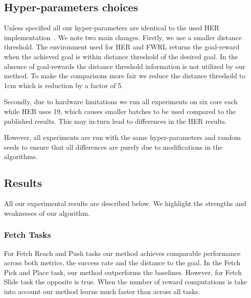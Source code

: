\subsection{Hyper-parameters choices}
Unless specified all our hyper-parameters are identical to the used HER
implementation~\citep{dhariwal2017baselines}. We note two main changes. Firstly,
we use a smaller distance threshold.
The environment used for HER and FWRL returns the goal-reward when the
achieved goal is within distance threshold of the desired goal. In the absence
of goal-rewards the distance threshold information is not utilized by our
method.
To make the comparisons more fair we reduce the distance threshold to 1cm which
is reduction by a factor of 5.

Secondly, due to hardware limitations we run all experiments on six core each
while HER uses 19, which causes smaller batches to be used compared to the
published results. This may in-turn lead to differences in the HER results.

However, all experiments are run with the same hyper-parameters and random seeds
to ensure that all differences are purely due to modifications in the algorithms.

\subsection{Results}
All our experimental results are described below. We highlight the strengths and
weaknesses of our algorithm.

\subsubsection{Fetch Tasks}

For Fetch Reach and Push tasks our method achieves comparable performance
across both metrics, the success rate and the distance to the goal. In the Fetch
Pick and Place task, our method outperforms the baselines. However, for Fetch
Slide task the opposite is true.
When the number of reward computations is take into account our method learns
much faster than across all tasks.

